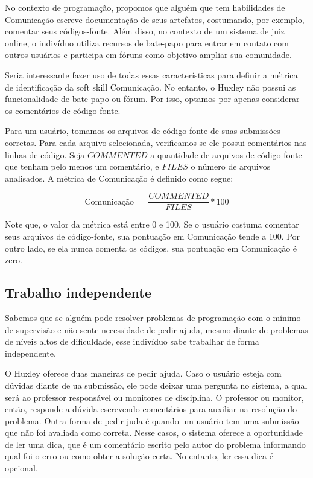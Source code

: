 No contexto de programação, propomos que alguém que tem habilidades de Comunicação escreve documentação de seus artefatos, costumando, por exemplo, comentar seus códigos-fonte. Além disso, no contexto de um sistema de juiz online, o indivíduo utiliza recursos de bate-papo para entrar em contato com outros usuários e participa em fóruns como objetivo ampliar sua comunidade.

Seria interessante fazer uso de todas essas características para definir a métrica de identificação da soft skill Comunicação. No entanto, o Huxley não possui as funcionalidade de bate-papo ou fórum. Por isso, optamos por apenas considerar os comentários de código-fonte.

Para um usuário, tomamos os arquivos de código-fonte de suas submissões corretas. Para cada arquivo selecionada, verificamos se ele possui comentários nas linhas de código. Seja $COMMENTED$ a quantidade de arquivos de código-fonte que tenham pelo menos um comentário, e $FILES$ o número de arquivos analisados. A métrica de Comunicação é definido como segue:

\begin{equation} \label{m:comunicacao}
\mbox{Comunicação } = \frac{ COMMENTED }{ FILES } * 100
\end{equation}

Note que, o valor da métrica está entre 0 e 100. Se o usuário costuma comentar seus arquivos de código-fonte, sua pontuação em Comunicação tende a 100. Por outro lado, se ela nunca comenta os códigos, sua pontuação em Comunicação é zero.

\subsection{Trabalho independente}

Sabemos que se alguém pode resolver problemas de programação com o mínimo de supervisão e não sente necessidade de pedir ajuda, mesmo diante de problemas de níveis altos de dificuldade, esse indivíduo sabe trabalhar de forma independente.

O Huxley oferece duas maneiras de pedir ajuda. Caso o usuário esteja com dúvidas diante de ua submissão, ele pode deixar uma pergunta no sistema, a qual será ao professor responsável ou monitores de disciplina. O professor ou monitor, então, responde a dúvida escrevendo comentários para auxiliar na resolução do problema. Outra forma de pedir juda é quando um usuário tem uma submissão que não foi avaliada como correta. Nesse casos, o sistema oferece a oportunidade de ler uma dica, que é um comentário escrito pelo autor do problema informando qual foi o erro ou como obter a solução certa. No entanto, ler essa dica é opcional.

